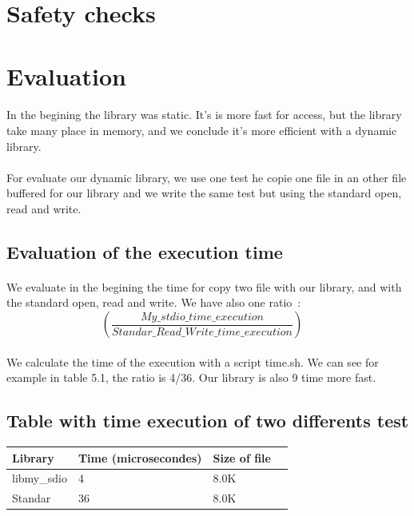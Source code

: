 \documentclass[a4paper,10pt]{article}
\begin{document}
\section{Safety checks}

\section{Evaluation}
\paragraph{}
In the begining the library was static. It's is more fast for access, but 
the library take many place in memory, and we conclude it's more efficient
with a dynamic library. 
\paragraph{}
For evaluate our dynamic library, we use one test he copie one file in an
other file buffered for our library and we write the same test 
but using the standard open, read and write.
\subsection{Evaluation of the execution time}
\paragraph{}
We evaluate in the begining the time for copy two file with our library, 
and with the standard open, read and write. We have also one ratio~: 
\begin{equation}
\left(\frac{My\_stdio\_time\_execution}{Standar\_Read\_Write\_time\_execution} \right)  \quad
\end{equation}
\paragraph{}
We calculate the time of the execution with a script time.sh. We can see
for example in table 5.1, the ratio is 4/36. Our library is also 9 time
more fast. 
\subsection{Table with time execution of two differents test}
\begin{tabular}{|R{2cm}|C{2cm}|L{1.5cm}|L{1.5cm}|}
\hline {}Library & Time (microsecondes) & Size of file\\
\hline  libmy\_sdio & 4 & 8.0K \\
\hline  Standar  & 36 & 8.0K \\
\hline 
\end{tabular}
\end{document}
